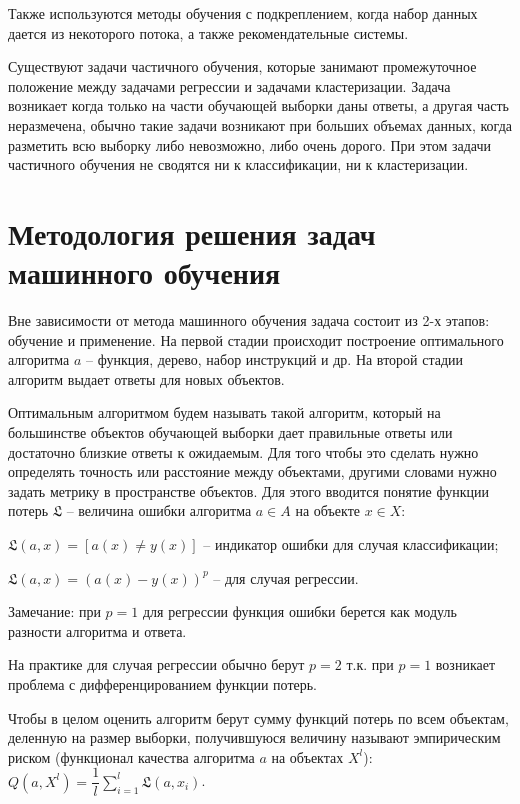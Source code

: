 Также используются методы обучения с подкреплением, когда набор данных дается из некоторого потока, а также рекомендательные системы.

Существуют задачи частичного обучения, которые занимают промежуточное положение между задачами регрессии и задачами кластеризации. Задача возникает когда только на части обучающей выборки даны ответы, а другая часть неразмечена, обычно такие задачи возникают при больших объемах данных, когда разметить всю выборку либо невозможно, либо очень дорого. При этом задачи частичного обучения не сводятся ни к классификации, ни к кластеризации.



\section{Методология решения задач машинного обучения}

Вне зависимости от метода машинного обучения задача состоит из 2-х этапов: обучение и применение.
На первой стадии происходит построение оптимального алгоритма $a$ -- функция, дерево, набор инструкций и др. На второй стадии алгоритм выдает ответы для новых объектов.

Оптимальным алгоритмом будем называть такой алгоритм, который на большинстве объектов обучающей выборки дает правильные ответы или достаточно близкие ответы к ожидаемым. Для того чтобы это сделать нужно определять точность или расстояние между объектами, другими словами нужно задать метрику в пространстве объектов. Для этого вводится понятие функции потерь $\mathfrak{L}$ -- величина ошибки алгоритма $a \in A$ на объекте $x \in X$:
\begin{description}[font=$\bullet$]
    \item $\mathfrak{L} (a,x)=[a(x) \neq y(x)]$ -- индикатор ошибки для случая классификации;
    \item $\mathfrak{L} (a,x)= (a(x) - y(x))^p$ -- для случая регрессии.
\end{description}

Замечание: при $p=1$ для регрессии функция ошибки берется как модуль разности алгоритма и ответа.

На практике для случая регрессии обычно берут $p=2$ т.к. при $p=1$ возникает проблема с дифференцированием функции потерь. 

Чтобы в целом оценить алгоритм берут сумму функций потерь по всем объектам, деленную на размер выборки, получившуюся величину называют эмпирическим риском (функционал качества алгоритма $a$ на объектах $X^l$): $Q(a, X^l) = \dfrac{1}{l}\sum\limits_{i=1}^{l}\mathfrak{L}(a,x_i)$.

